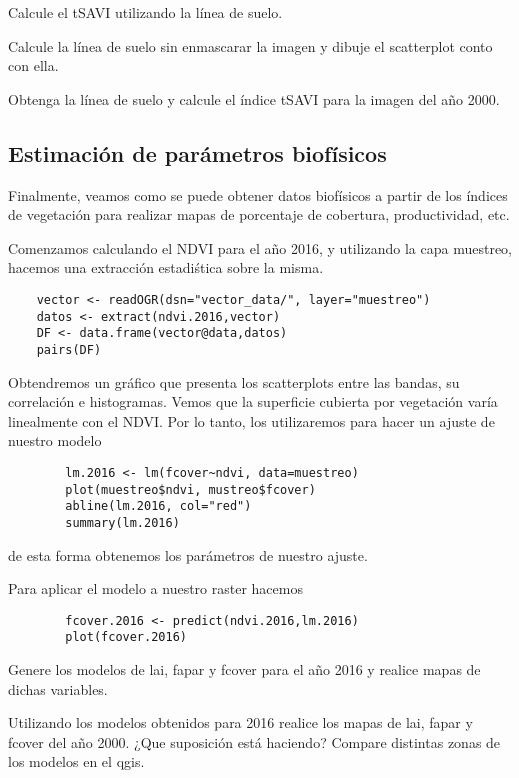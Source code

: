 \begin{act}
    Calcule el tSAVI utilizando la l\'inea de suelo.
\end{act}

\begin{act}
    Calcule la l\'inea de suelo sin enmascarar la imagen y dibuje el
    scatterplot conto con ella.
\end{act}

\begin{act}
    Obtenga la l\'inea de suelo y calcule el \'indice tSAVI para la imagen del año
    2000.
\end{act}

\subsection{Estimaci\'on de par\'ametros biof\'isicos}

Finalmente, veamos como se puede obtener datos biof\'isicos a partir de los
\'indices de vegetaci\'on para realizar mapas de
porcentaje de cobertura, productividad, etc.

\begin{exa}
    Comenzamos calculando el NDVI para el año 2016, y utilizando la capa
    muestreo, hacemos una extracci\'on estadi\'stica sobre la misma.
    \begin{lstlisting}
    vector <- readOGR(dsn="vector_data/", layer="muestreo")
    datos <- extract(ndvi.2016,vector)
    DF <- data.frame(vector@data,datos)
    pairs(DF)
    \end{lstlisting}

    Obtendremos un gr\'afico que presenta los scatterplots entre las bandas, su
    correlaci\'on e histogramas.
    Vemos que la superficie cubierta por vegetaci\'on var\'ia
    linealmente con el NDVI\@. Por lo tanto, los utilizaremos para hacer un ajuste de nuestro modelo

    \begin{lstlisting}
        lm.2016 <- lm(fcover~ndvi, data=muestreo)
        plot(muestreo$ndvi, mustreo$fcover)
        abline(lm.2016, col="red")
        summary(lm.2016)
    \end{lstlisting}

    de esta forma obtenemos los par\'ametros de nuestro ajuste.

    Para aplicar el modelo a nuestro raster hacemos
    \begin{lstlisting}
        fcover.2016 <- predict(ndvi.2016,lm.2016)
        plot(fcover.2016)
    \end{lstlisting}
\end{exa}

\begin{act}
    Genere los modelos de lai, fapar y fcover para el año 2016 y
    realice mapas de dichas variables.
\end{act}

\begin{act}
    Utilizando los modelos obtenidos para 2016 realice
    los mapas de lai, fapar y fcover del año 2000. ¿Que suposici\'on est\'a
    haciendo? Compare distintas zonas de los modelos en el qgis.
\end{act}
